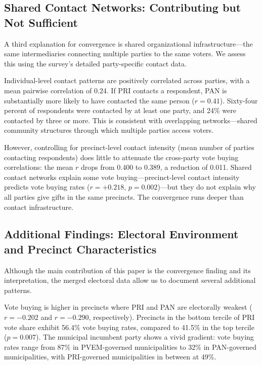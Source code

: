 \documentclass[12pt,letterpaper]{article}
\begin{document}
\subsection{Shared Contact Networks: Contributing but Not Sufficient}

A third explanation for convergence is shared organizational infrastructure---the same intermediaries connecting multiple parties to the same voters. We assess this using the survey's detailed party-specific contact data.

Individual-level contact patterns are positively correlated across parties, with a mean pairwise correlation of 0.24. If PRI contacts a respondent, PAN is substantially more likely to have contacted the same person ($r = 0.41$). Sixty-four percent of respondents were contacted by at least one party, and 24\% were contacted by three or more. This is consistent with overlapping networks---shared community structures through which multiple parties access voters.

However, controlling for precinct-level contact intensity (mean number of parties contacting respondents) does little to attenuate the cross-party vote buying correlations: the mean $r$ drops from 0.400 to 0.389, a reduction of 0.011. Shared contact networks explain some vote buying---precinct-level contact intensity predicts vote buying rates ($r = +0.218$, $p = 0.002$)---but they do not explain why all parties give gifts in the same precincts. The convergence runs deeper than contact infrastructure.


\subsection{Additional Findings: Electoral Environment and Precinct Characteristics}

Although the main contribution of this paper is the convergence finding and its interpretation, the merged electoral data allow us to document several additional patterns.

Vote buying is higher in precincts where PRI and PAN are electorally weakest ($r = -0.202$ and $r = -0.290$, respectively). Precincts in the bottom tercile of PRI vote share exhibit 56.4\% vote buying rates, compared to 41.5\% in the top tercile ($p = 0.007$). The municipal incumbent party shows a vivid gradient: vote buying rates range from 87\% in PVEM-governed municipalities to 32\% in PAN-governed municipalities, with PRI-governed municipalities in between at 49\%.
\end{document}
